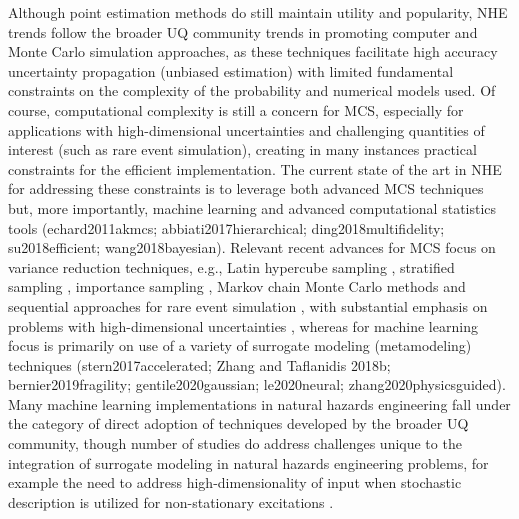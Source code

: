 Although point estimation methods do still maintain utility and popularity, NHE trends follow the broader UQ community trends in promoting computer and Monte Carlo simulation approaches, as these techniques facilitate high accuracy uncertainty propagation (unbiased estimation) with limited fundamental constraints on the complexity of the probability and numerical models used. Of course, computational complexity is still a concern for MCS, especially for applications with high-dimensional uncertainties and challenging quantities of interest (such as rare event simulation), creating in many instances practical constraints for the efficient implementation. The current state of the art in NHE for addressing these constraints is to leverage both advanced MCS techniques \citep{au2003subset,li2017system,bansal2018subset} but, more importantly, machine learning and advanced computational statistics tools (echard2011akmcs; abbiati2017hierarchical; ding2018multifidelity; su2018efficient; wang2018bayesian). Relevant recent advances for MCS focus on variance reduction techniques, e.g., Latin hypercube sampling \citep{vamvatsikos2014seismic}, stratified sampling \citep{jayaram2010efficient}, importance sampling \citep{papaioannou2018reliability}, Markov chain Monte Carlo methods \citep{au2003subset} and sequential approaches for rare event simulation \citep{jia2017new}, with substantial emphasis on problems with high-dimensional uncertainties \citep{au2003subset,wang2016crossentropybased}, whereas for machine learning focus is primarily on use of a variety of surrogate modeling (metamodeling) techniques (stern2017accelerated; Zhang and Taflanidis 2018b; bernier2019fragility; gentile2020gaussian; le2020neural; zhang2020physicsguided). Many machine learning implementations in natural hazards engineering fall under the category of direct adoption of techniques developed by the broader UQ community, though number of studies do address challenges unique to the integration of surrogate modeling in natural hazards engineering problems, for example the need to address high-dimensionality of input when stochastic description is utilized for non-stationary excitations \citep{gidaris2015kriging}.  

